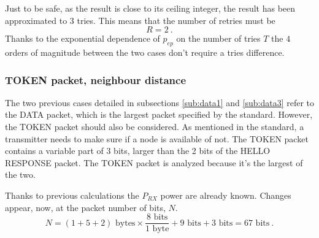 Just to be safe, as the result is close to its ceiling integer, the result has been approximated to $3$ tries. This means that the number of retries must be
\begin{equation}
	R = 2 \ .
\end{equation}
Thanks to the exponential dependence of $p_{ep}$ on the number of tries $T$ the $4$ orders of magnitude between the two cases don't require a tries difference.



\subsubsection{TOKEN packet, neighbour distance} \label{sub:token1}
The two previous cases detailed in subsections \ref{sub:data1} and \ref{sub:data3} refer to the DATA packet, which is the largest packet specified by the standard. However, the TOKEN packet should also be considered. As mentioned in the standard, a transmitter needs to make sure if a node is available of not. The TOKEN packet contains a variable part of \SI{3}{} bits, larger than the \SI{2}{} bits of the HELLO RESPONSE packet. The TOKEN packet is analyzed because it's the largest of the two.

Thanks to previous calculations the $P_{RX}$ power are already known. Changes appear, now, at the packet number of bits, $N$.
\begin{equation}
	N = \left( 1 + 5 + 2  \right)  \text{ bytes} \times \frac{8 \text{ bits}}{1 \text{ byte}} + 9 \text{ bits} + 3 \text{ bits} = 67 \text{ bits} \ .
\end{equation}


